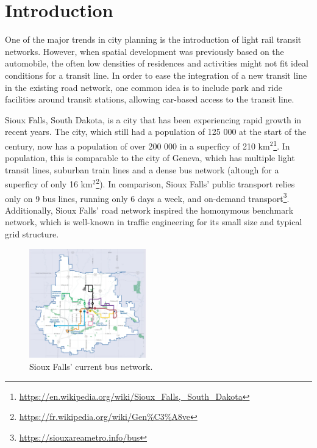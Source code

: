 
\section{Introduction}

One of the major trends in city planning is the introduction of light rail transit networks. However, when spatial development was previously based on the automobile, the often low densities of residences and activities might not fit ideal conditions for a transit line. In order to ease the integration of a new transit line in the existing road network, one common idea is to include park and ride facilities around transit stations, allowing car-based access to the transit line.

Sioux Falls, South Dakota, is a city that has been experiencing rapid growth in recent years. The city, which still had a population of 125 000 at the start of the century, now has a population of over 200 000 in a superficy of 210 km$^2$\footnote{\url{https://en.wikipedia.org/wiki/Sioux_Falls,_South_Dakota}}. In population, this is comparable to the city of Geneva, which has multiple light transit lines, suburban train lines and a dense bus network (altough for a superficy of only 16 km$^2$\footnote{\url{https://fr.wikipedia.org/wiki/Gen\%C3\%A8ve}}). In comparison, Sioux Falls' public transport relies only on 9 bus lines, running only 6 days a week, and on-demand transport\footnote{\url{https://siouxareametro.info/bus}}. Additionally, Sioux Falls' road network inspired the homonymous benchmark network, which is well-known in traffic engineering for its small size and typical grid structure.

\begin{figure}
    \centering
    \includegraphics[keepaspectratio,width=0.45\textwidth]{Figures/siouxfalls_bus_network.png}
    \caption{Sioux Falls' current bus network.}
    \label{fig:sioux_falls_bus_network}
\end{figure}



